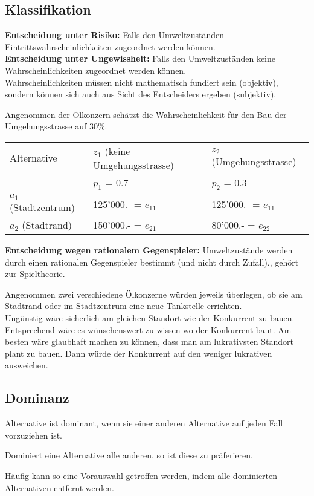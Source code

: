 \subsection{Klassifikation}
\textbf{Entscheidung unter Risiko:} Falls den Umweltzuständen Eintrittswahrscheinlichkeiten zugeordnet werden können. \\
\textbf{Entscheidung unter Ungewissheit:} Falls den Umweltzuständen keine Wahrscheinlichkeiten zugeordnet werden können. \\
Wahrscheinlichkeiten müssen nicht mathematisch fundiert sein (objektiv), sondern können sich auch aus Sicht des Entscheiders ergeben (subjektiv).
\begin{example}
	Angenommen der Ölkonzern schätzt die Wahrscheinlichkeit für den Bau	der Umgehungsstrasse auf 30\%. \\
	\begin{tabular}{|l|l|l|}
		\hline
		Alternative & $z_1$ (keine Umgehungsstrasse) & $z_2$ (Umgehungsstrasse) \\ 
		& $p_1$ = 0.7 & $p_2$ = 0.3 \\ \hline
		$a_1$ (Stadtzentrum) & 125'000.- = $e_{11}$ & 125'000.- = $e_{11}$ \\ \hline
		$a_2$ (Stadtrand) & 150'000.- = $e_{21}$ & 80'000.- = $e_{22}$ \\ \hline
	\end{tabular}
\end{example}
\textbf{Entscheidung wegen rationalem Gegenspieler:} Umweltzustände werden durch einen rationalen Gegenspieler bestimmt (und nicht durch Zufall)., gehört zur Spieltheorie.
\begin{example}
	Angenommen zwei verschiedene Ölkonzerne würden jeweils überlegen, ob sie am Stadtrand oder im Stadtzentrum eine neue Tankstelle errichten. \\
	Ungünstig wäre sicherlich am gleichen Standort wie der Konkurrent zu bauen. Entsprechend wäre es wünschenswert zu wissen wo der
	Konkurrent baut. Am besten wäre glaubhaft machen zu können, dass man am lukrativsten Standort plant zu bauen. Dann würde der Konkurrent auf den weniger lukrativen ausweichen.
\end{example}

\subsection{Dominanz}
\begin{compactitem}
	\item Alternative ist dominant, wenn sie einer anderen Alternative auf jeden Fall vorzuziehen ist.
	\item Dominiert eine Alternative alle anderen, so ist diese zu präferieren.
	\item Häufig kann so eine Vorauswahl getroffen werden, indem alle dominierten Alternativen entfernt werden.
\end{compactitem}

